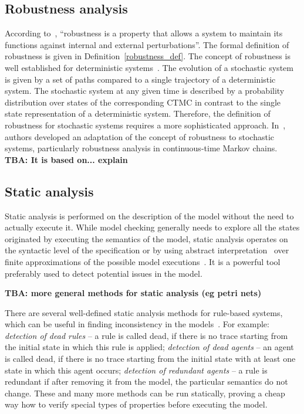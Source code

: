 \documentclass[11pt,a4paper]{report}
\begin{document}
\subsection{Robustness analysis}

According to~\cite{kitano2004biological}, ``robustness is a property that allows a system to maintain its functions against internal and external perturbations''. The formal definition of robustness is given in Definition~\ref{robustness_def}. The concept of robustness is well established for deterministic systems~\cite{donze2011robustness,rizk2009general}. The evolution of a stochastic system is given
by a set of paths compared to a single trajectory of a deterministic system. The stochastic system at any given time is described by a probability distribution over states of the corresponding CTMC in contrast to the single state representation of a deterministic system. Therefore, the definition of robustness for stochastic systems requires a more sophisticated approach. In~\cite{vceska2014robustness}, authors developed an adaptation of the concept of robustness to stochastic systems, particularly robustness analysis in continuous-time Markov chains. 
\textbf{TBA: It is based on... explain}

\subsection{Static analysis}\label{static_analysis}

Static analysis is performed on the description of the model without the need to actually execute it. While model checking generally needs to explore all the states originated by executing the semantics of the model, static analysis operates on the syntactic level of the specification or by using abstract interpretation~\cite{cousot1977abstract} over finite approximations of the possible model executions~\cite{pauleve2012static}. It is a powerful tool preferably used to detect potential issues in the model.

\textbf{TBA: more general methods for static analysis (eg petri nets)}

There are several well-defined static analysis methods for rule-based systems, which can be useful in finding inconsistency in the models~\cite{danos2009rule}. For example: \emph{detection of dead rules} -- a rule is called dead, if there is no trace starting from the initial state in which this rule is applied; \emph{detection of dead agents} -- an agent is called dead, if there is no trace starting from the initial state with at least one state in which this agent occurs; \emph{detection of redundant agents} -- a rule is redundant if after removing it from the model, the particular semantics do not change. These and many more methods can be run statically, proving a cheap way how to verify special types of properties before executing the model.
\end{document}
